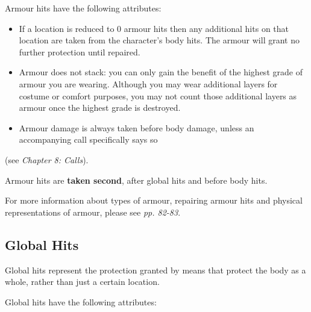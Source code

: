 Armour hits have the following attributes:

\begin{itemize}
\item If a location is reduced to 0 armour hits then any additional hits on that location are taken from the character's body hits. The armour will grant no further protection until repaired.

\item Armour does not stack: you can only gain the benefit of the highest grade of armour you are wearing. Although you may wear additional layers for costume or comfort purposes, you may not count those additional layers as armour once the highest grade is destroyed.

\item Armour damage is always taken before body damage, unless an accompanying call specifically says so

\end{itemize}
(see \textit{Chapter 8: Calls}).

Armour hits are \textbf{taken second}, after global hits and before body hits.

For more information about types of armour, repairing armour hits and physical representations of armour, please see \textit{pp. 82-83}.

\subsection{Global Hits}

Global hits represent the protection granted by means that protect the body as a whole, rather than just a certain location.

Global hits have the following attributes:

